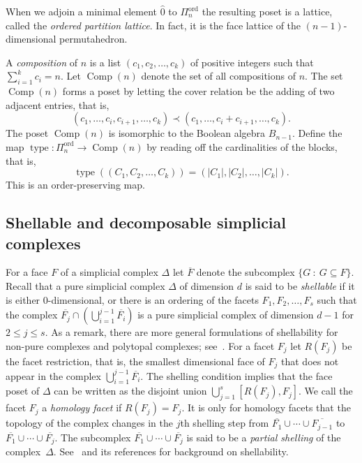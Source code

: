 \documentclass[10pt]{amsart}
\theoremstyle{definition}
\DeclareMathOperator{\Comp}{Comp}
\DeclareMathOperator{\type}{type}
\DeclareMathOperator{\ord}{ord}
\newcommand{\hz}{\hat{0}}
\newcommand{\coveredby}{\prec}
\newcommand{\cupdots}{\cup \cdots \cup}
\newcommand{\Qn}{\Pi^{\ord}_{n}}
\begin{document}
When we adjoin a minimal element $\hz$ to $\Qn$
the resulting poset is a lattice,
called the \emph{ordered partition lattice}. In fact, it is
the face lattice of the $(n-1)$-dimensional permutahedron.


A \emph{composition} of $n$ is a list 
$(c_{1}, c_{2}, \ldots, c_{k})$ of positive integers
such that $\sum_{i=1}^{k} c_{i} = n$.
Let $\Comp(n)$ denote the set of all compositions of $n$.
The set $\Comp(n)$ forms a poset by letting
the cover relation be the adding of two adjacent entries,
that is,
$$
(c_{1}, \ldots, c_{i}, c_{i+1}, \ldots, c_{k})
\coveredby
(c_{1}, \ldots, c_{i} + c_{i+1}, \ldots, c_{k}) .
$$
The poset $\Comp(n)$ is isomorphic to the Boolean algebra $B_{n-1}$.
Define the map $\type : \Qn \longrightarrow \Comp(n)$
by reading off the cardinalities of the blocks, that is,
$$ \type((C_{1}, C_{2}, \ldots, C_{k})) = (|C_{1}|, |C_{2}|, \ldots, |C_{k}|) . $$
This is an order-preserving map. 

\subsection{Shellable and decomposable simplicial complexes}

For a face $F$ of a simplicial complex $\Delta$
let $\overline{F}$ denote the subcomplex
$\{G \: : \: G \subseteq F\}$.
Recall that a pure simplicial complex $\Delta$ 
of dimension $d$ is said to be
\emph{shellable} if 
it is either $0$-dimensional, or
there is an ordering of the facets $F_{1}, F_{2}, \ldots, F_{s}$
such that  the complex
$\overline{F_{j}} \cap \left(\bigcup_{i=1}^{j-1} \overline{F_{i}}\right)$
is a pure simplicial complex of dimension $d-1$ for $2 \leq j \leq s$.
As a remark, there are more general formulations of 
shellability for non-pure
complexes and polytopal complexes; see~\cite{Bjorner_Wachs}.
For a facet $F_{j}$ let $R(F_{j})$ be the 
facet restriction, that is, the smallest dimensional face
of $F_{j}$ that does not appear in the complex
$\bigcup_{i=1}^{j-1} \overline{F_{i}}$.
The shelling condition implies
that the face poset of $\Delta$ can be written as the disjoint union
$\bigcup_{j=1}^{s} [R(F_{j}), F_{j}]$.
We call the facet $F_{j}$ a \emph{homology facet}
if $R(F_{j}) = F_{j}$.
It is only for homology facets that the topology
of the complex 
changes in the $j$th shelling step from
$\overline{F_{1}} \cupdots \overline{F_{j-1}}$
to
$\overline{F_{1}} \cupdots \overline{F_{j}}$.
The subcomplex
$\overline{F_{1}} \cupdots \overline{F_{j}}$
is said to be a
\emph{partial shelling} 
of the complex~$\Delta$.
See~\cite{Bjorner,Stanley_green} and its references for background on shellability.
\end{document}
